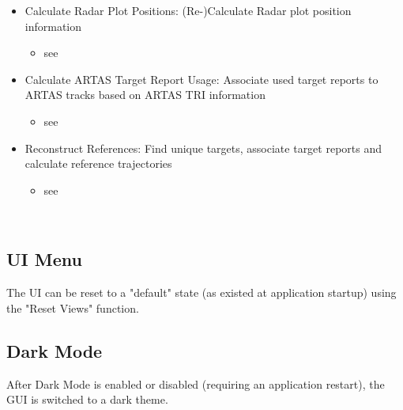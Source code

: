 \begin{itemize}
 \item Calculate Radar Plot Positions: (Re-)Calculate Radar plot position information
   \begin{itemize}
 \item see 
 \end{itemize}
 \item Calculate ARTAS Target Report Usage: Associate used target reports to ARTAS tracks based on ARTAS TRI information
   \begin{itemize}
   \item see 
   \end{itemize}
  \item Reconstruct References: Find unique targets, associate target reports and calculate reference trajectories
   \begin{itemize}
 \item see 
 \end{itemize}

\end{itemize}
\  \\

\subsection{UI Menu}
\label{sec:ui_overview_ui_menu}

The UI can be reset to a "default" state (as existed at application startup) using the "Reset Views" function.










\subsection{Dark Mode}
\label{sec:ui_overview_dark_mode}

After Dark Mode is enabled or disabled (requiring an application restart), the GUI is switched to a dark theme.

